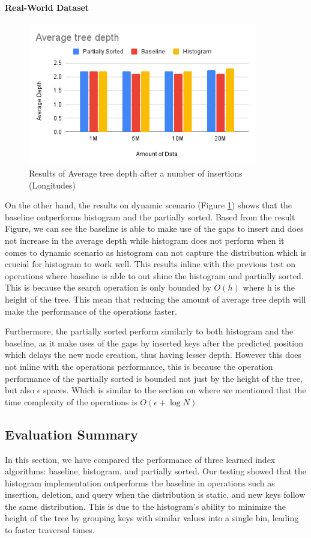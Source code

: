 \documentclass[11pt,a4paper]{article}
\begin{document}
\paragraph{Real-World Dataset}
\begin{figure}
    \centering
    \includegraphics[width=100mm,scale=1]{Figures/AVGTD-Long.png}
    \caption{
     Results of Average tree depth after a number of insertions (Longitudes)
    }
    \label{fig:AverageTreeDepthLong}
\end{figure}
On the other hand, the results on dynamic scenario (Figure \ref{fig:AverageTreeDepthLong}) shows that the baseline outperforms histogram and the partially sorted. Based from the result Figure, we can see the baseline is able to make use of the gaps to insert and does not increase in the average depth while histogram does not perform when it comes to dynamic scenario as histogram can not capture the distribution which is crucial for histogram to work well. This results inline with the previous test on operations where baseline is able to out shine the histogram and partially sorted. This is because the search operation is only bounded by $O(h)$ where h is the height of the tree. This mean that reducing the amount of average tree depth will make the performance of the operations faster. 

Furthermore, the partially sorted perform similarly to both histogram and the baseline, as it make uses of the gaps by inserted keys after the predicted position which delays the new node creation, thus having lesser depth. However this does not inline with the operations performance, this is because the operation performance of the partially sorted is bounded not just by the height of the tree, but also $\epsilon$ spaces. Which is similar to the section on  where we mentioned that the time complexity of the operations is $O(\epsilon + \log N)$


\subsection{Evaluation Summary}
In this section, we have compared the performance of three learned index algorithms: baseline, histogram, and partially sorted. Our testing showed that the histogram implementation outperforms the baseline in operations such as insertion, deletion, and query when the distribution is static, and new keys follow the same distribution. This is due to the histogram's ability to minimize the height of the tree by grouping keys with similar values into a single bin, leading to faster traversal times.
\end{document}
